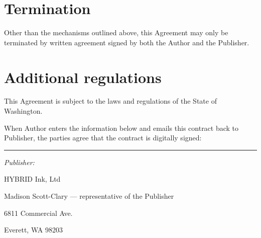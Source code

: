 \documentclass[12pt,letterpaper,oneside]{article}
\def\lbl#1{\hbox to 4cm{#1\dotfill\strut}}%
\def\labelline#1#2{\lbl{#1}\vbox{\hbox{\TextField[name=#1,width=#2]{\null}}\kern2pt\hrule}}
\def\q#1{\hbox to \hsize{\labelline{#1}{\longline}}\vskip1.4ex}
\begin{document}
\section{Termination}

Other than the mechanisms outlined above, this Agreement may only be terminated by written agreement signed by both the Author and the Publisher.

\section{Additional regulations}

This Agreement is subject to the laws and regulations of the State of Washington.

\newpage

When Author enters the information below and emails this contract back to Publisher, the parties agree that the contract is digitally signed:


\hrule

\vspace{12pt}

\noindent \textit{Publisher:}

HYBRID Ink, Ltd

Madison Scott-Clary --- representative of the Publisher

6811 Commercial Ave.

Everett, WA 98203
\end{document}
